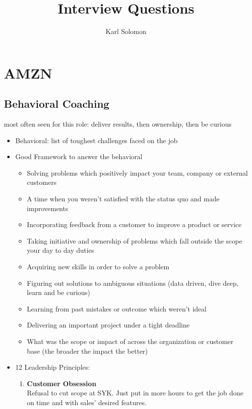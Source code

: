 \documentclass{article}
\begin{document}
\selectfont
\title{Interview Questions}
\author{Karl Solomon}

\maketitle
\small

\section{AMZN}
\subsection{Behavioral Coaching}
most often seen for this role: deliver results, then ownership, then be curious
\begin{itemize}
    \item Behavioral: list of toughest challenges faced on the job
	\item Good Framework to answer the behavioral
		\begin{itemize}
			\item Solving problems which positively impact your team, company or external customers
			\item A time when you weren’t satisfied with the status quo and made improvements
			\item Incorporating feedback from a customer to improve a product or service
			\item Taking initiative and ownership of problems which fall outside the scope your day to day duties 
			\item Acquiring new skills in order to solve a problem
			\item Figuring out solutions to ambiguous situations (data driven, dive deep, learn and be curious)
			\item Learning from past mistakes or outcome which weren’t ideal
			\item Delivering an important project under a tight deadline
			\item What was the scope or impact of across the organization or customer base (the broader the impact the better)
		\end{itemize}
	\item 12 Leadership Principles:
		\begin{enumerate}
			\item \textbf{Customer Obsession }\\
				Refusal to cut scope at SYK. Just put in more hours to get the job done on time and with sales' desired features.

\end{enumerate}
\end{itemize}
\end{document}
